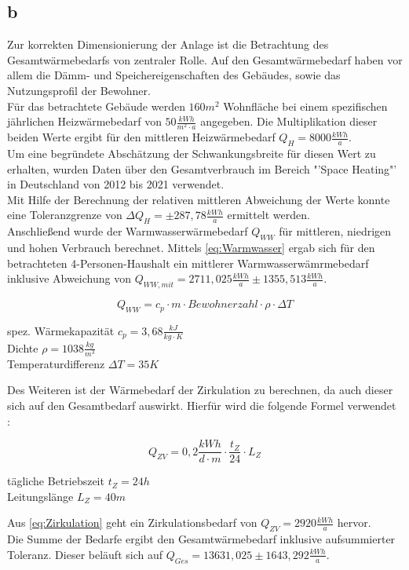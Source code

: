 \subsection{b}
Zur korrekten Dimensionierung der Anlage ist die Betrachtung des Gesamtwärmebedarfs von zentraler Rolle.
Auf den Gesamtwärmebedarf haben vor allem die Dämm- und Speichereigenschaften des Gebäudes, sowie das Nutzungsprofil der Bewohner.\\
Für das betrachtete Gebäude werden $160 m^2$ Wohnfläche bei einem spezifischen jährlichen Heizwärmebedarf von $50 \frac{kWh}{m^2 \cdot a}$ angegeben.
Die Multiplikation dieser beiden Werte ergibt für den mittleren Heizwärmebedarf $Q_H = 8000 \frac{kWh}{a}$.\\
Um eine begründete Abschätzung der Schwankungsbreite für diesen Wert zu erhalten, wurden Daten über den Gesamtverbrauch im Bereich "'Space Heating"' in Deutschland von 2012 bis 2021 verwendet.\\
Mit Hilfe der Berechnung der relativen mittleren Abweichung der Werte konnte eine Toleranzgrenze von $\Delta Q_H = \pm 287,78 \frac{kWh}{a}$ ermittelt werden.\\
Anschließend wurde der Warmwasserwärmebedarf $Q_{WW}$ für mittleren, niedrigen und hohen Verbrauch \cite[S.119]{Sick22} berechnet.
Mittels \autoref{eq:Warmwasser} ergab sich für den betrachteten 4-Personen-Haushalt ein mittlerer Warmwasserwämrmebedarf inklusive Abweichung von $Q_{WW,mit} = 2711,025 \frac{kWh}{a} \pm 1355,513 \frac{kWh}{a}$.

\begin{equation}
    Q_{WW}= c_p \cdot m \cdot Bewohnerzahl \cdot \rho \cdot \Delta T
    \label{eq:Warmwasser}
\end{equation}
\vspace{\baselineskip}
\begin{center}
    spez. Wärmekapazität $c_p = 3,68 \frac{kJ}{kg \cdot K}$\\
    Dichte $\rho = 1038 \frac{kg}{m^3}$\\
    Temperaturdifferenz $\Delta T = 35 K$ 
\end{center}

Des Weiteren ist der Wärmebedarf der Zirkulation zu berechnen, da auch dieser sich auf den Gesamtbedarf auswirkt.
Hierfür wird die folgende Formel verwendet \cite[S.73]{Sick22}:

\begin{equation}
    Q_{ZV} = 0,2 \frac{kWh}{d \cdot m} \cdot \frac{t_Z}{24} \cdot L_Z
    \label{eq:Zirkulation}
\end{equation}
\begin{center}
    tägliche Betriebszeit $t_Z = 24 h$\\
    Leitungslänge $L_Z = 40 m$
\end{center}
\vspace{\baselineskip}
Aus \autoref{eq:Zirkulation} geht ein Zirkulationsbedarf von $Q_{ZV} = 2920 \frac{kWh}{a}$ hervor.\\
Die Summe der Bedarfe ergibt den Gesamtwärmebedarf inklusive aufsummierter Toleranz.
Dieser beläuft sich auf $Q_{Ges}=13631,025 \pm 1643,292 \frac{kWh}{a}$.\\